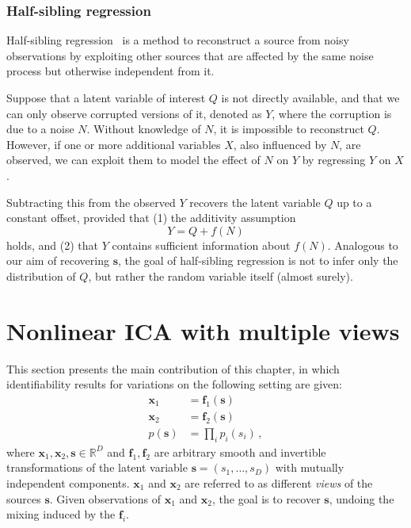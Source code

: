 \subsubsection{Half-sibling regression}
\label{sec:hsr}
Half-sibling regression~\citep{scholkopf2016modeling} is a method to reconstruct a source from noisy observations by exploiting other sources that are affected by the same noise process but otherwise independent from it.

Suppose that a latent variable of interest $Q$ is not directly available, and that we can only observe corrupted versions of it, denoted as  $Y$, where the corruption is due to a noise $N$.
Without knowledge of $N$, it is impossible to reconstruct $Q$. However, if one or more additional variables $X$, also influenced by $N$, are observed, we can exploit them to model the effect of $N$ on $Y$ by regressing $Y$ on $X$.

Subtracting this from the observed $Y$ recovers the latent variable $Q$ up to a constant offset,
provided that (1) the additivity assumption
\[
Y = Q + f(N)
\]
holds, and (2) that $Y$ contains sufficient information about $f(N)$.
Analogous to our aim of recovering $\bm{s}$,
the goal of half-sibling regression is not to infer only the distribution of $Q$, but rather the random variable itself (almost surely).

\section{Nonlinear ICA with multiple views}\label{sec:ica-nonlinear-ica-with-mulitple-views}

This section presents the main contribution of this chapter, in which identifiability results for variations on the following setting are given:
\begin{align}
\bm{x}_1 &= \bm{f}_1(\bm{s}) \label{eq:nonlinear-ica-1}\\
\bm{x}_2 &= \bm{f}_2(\bm{s}) \label{eq:nonlinear-ica-2}\\
p(\bm{s}) &= \prod_{i} p_i(s_i) \label{eq:firstind}\,,
\end{align}
where $\bm{x}_1, \bm{x}_2, \bm{s} \in \mathbb{R}^D$ and $\bm{f}_1, \bm{f}_2$ are arbitrary smooth and invertible transformations of the latent variable $\bm{s} = (s_1, \ldots, s_D)$ with mutually independent components.
$\bm{x}_1$ and $\bm{x}_2$ are referred to as different \emph{views} of the sources $\bm{s}$.
Given observations of $\bm{x}_1$ and $\bm{x}_2$, the goal is to recover $\bm{s}$, undoing the mixing induced by the $\bm{f}_i$.

